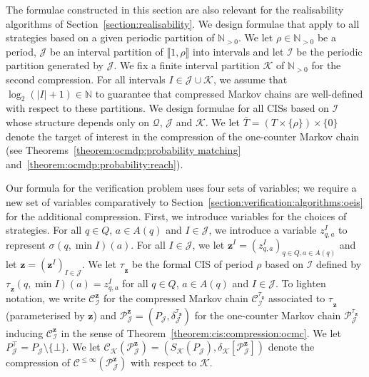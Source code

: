 \documentclass[a4paper,UKenglish,cleveref,autoref,thm-restate,colorlinks]{lipics-v2021}
\newcommand{\integerInterval}[1]{\llbracket{}#1\rrbracket{}}
\newcommand{\IN}{\mathbb{N}}
\newcommand{\INpos}{\IN_{>0}}
\newcommand{\mdpStateSpace}{S}
\newcommand{\ocmdp}{\mathcal{Q}}
\newcommand{\ocStateSpace}{Q}
\newcommand{\ocState}{q}
\newcommand{\ocActionSpace}{A}
\newcommand{\ocAction}{a}
\newcommand{\ocTrans}{\delta}
\newcommand{\period}{\rho}
\newcommand{\mchain}{\mathcal{C}}
\newcommand{\ocChain}{\mathcal{P}}
\newcommand{\ocChainFin}[2]{\mchain^{\leq #2}(#1)}
\newcommand{\intPart}{\mathcal{I}}
\newcommand{\intPartB}{\mathcal{J}}
\newcommand{\intPartC}{\mathcal{K}}
\newcommand{\interval}{I}
\newcommand{\compressChainStrat}[1]{\mchain^{#1}_{\intPart}}
\newcommand{\cisChainStrat}[1]{\ocChain^{#1}_{\intPartB}}
\newcommand{\cisChainStateSpace}{P_{\intPartB}}
\newcommand{\cisChainStateSpaceStar}{P_{\intPartB}^{\top}}
\newcommand{\cisChainTransTemplate}[2]{\ocTrans_{#1}^{#2}}
\newcommand{\compressCisStateSpace}{\mdpStateSpace_{\intPartC}({\cisChainStateSpace})}
\newcommand{\varStrat}{z}
\newcommand{\varStratI}{\mathbf{\varStrat}^{\interval}}
\newcommand{\varStratTuple}{\mathbf{\varStrat}}
\newcommand{\compressChainSymbolicVerbose}{\compressChainStrat{\stratB_{\varStratTuple}}}
\newcommand{\compressChainSymbolic}{\compressChainStrat{\varStratTuple}}
\newcommand{\cisChainSymbolic}{\cisChainStrat{\varStratTuple}}
\newcommand{\cisChainSymbolicVerbose}{\cisChainStrat{\stratB_{\varStratTuple}}}
\newcommand{\cisChainTransSymbolic}{\cisChainTransTemplate{\intPartB}{\stratB_{\varStratTuple}}}
\newcommand{\cisChainTupleSymbolic}{(\cisChainStateSpace, \cisChainTransSymbolic)}
\newcommand{\compressCisSymbolic}{\mchain_{\intPartC}({\cisChainSymbolic})}
\newcommand{\compressCisTransSymbolic}{\ocTrans_{\intPartC}[{\cisChainSymbolic}]}
\newcommand{\compressCisTupleSymbolic}{(\compressCisStateSpace, \compressCisTransSymbolic)}
\newcommand{\target}{T}
\newcommand{\stratGeneric}[1]{{\sigma_{#1}}}
\newcommand{\strat}{\stratGeneric{}}
\newcommand{\stratBGeneric}[1]{{\tau_{#1}}}
\newcommand{\stratB}{\stratBGeneric{}}
\begin{document}
The formulae constructed in this section are also relevant for the realisability algorithms of Section~\ref{section:realisability}.
We design formulae that apply to all strategies based on a given periodic partition of $\INpos$.
We let $\period\in\INpos$ be a period, $\intPartB$ be an interval partition of $\integerInterval{1, \period}$ into intervals and let $\intPart$ be the periodic partition generated by $\intPartB$.
We fix a finite interval partition $\intPartC$ of $\INpos$ for the second compression.
For all intervals $\interval\in\intPartB\cup\intPartC$, we assume that $\log_2(|\interval|+1)\in\IN$ to guarantee that compressed Markov chains are well-defined with respect to these partitions.
We design formulae for all CISs based on $\intPart$ whose structure depends only on $\ocmdp$, $\intPartB$ and $\intPartC$.
We let $\bar{\target} = (\target\times\{\period\})\times\{0\}$ denote the target of interest in the compression of the one-counter Markov chain (see Theorems~\ref{theorem:ocmdp:probability matching} and~\ref{theorem:ocmdp:probability:reach}).

Our formula for the verification problem uses four sets of variables; we require a new set of variables comparatively to Section~\ref{section:verification:algorithms:oeis} for the additional compression.
First, we introduce variables for the choices of strategies.
For all $\ocState\in\ocStateSpace$, $\ocAction\in\ocActionSpace(\ocState)$ and $\interval\in\intPartB$, we introduce a variable $\varStrat_{\ocState, \ocAction}^\interval$ to represent $\strat(\ocState,\min\interval)(\ocAction)$.
For all $\interval\in\intPartB$, we let $\varStratI = (\varStrat^\interval_{\ocState, \ocAction})_{\ocState\in\ocStateSpace, \ocAction\in\ocActionSpace(\ocState)}$ and let $\varStratTuple=(\varStratI)_{\interval\in\intPartB}$.
We let $\stratB_{\varStratTuple}$ be the formal CIS of period $\period$ based on $\intPart$ defined by $\stratB_{\varStratTuple}(\ocState, \min\interval)(\ocAction) = \varStrat^\interval_{\ocState, \ocAction}$ for all $\ocState\in\ocStateSpace$, $\ocAction\in\ocActionSpace(\ocState)$ and $\interval\in\intPartB$.
To lighten notation, we write $\compressChainSymbolic$ for the compressed Markov chain $\compressChainSymbolicVerbose$ associated to $\stratB_{\varStratTuple}$ (parameterised by $\varStratTuple$) and $\cisChainSymbolic=\cisChainTupleSymbolic$ for the one-counter Markov chain $\cisChainSymbolicVerbose$ inducing $\compressChainSymbolic$ in the sense of Theorem~\ref{theorem:cis:compression:ocmc}.
We let $\cisChainStateSpaceStar = \cisChainStateSpace\setminus\{\bot\}$.
We let $\compressCisSymbolic = \compressCisTupleSymbolic$ denote the compression of $\ocChainFin{\cisChainSymbolic}{\infty}$ with respect to $\intPartC$.
\end{document}
